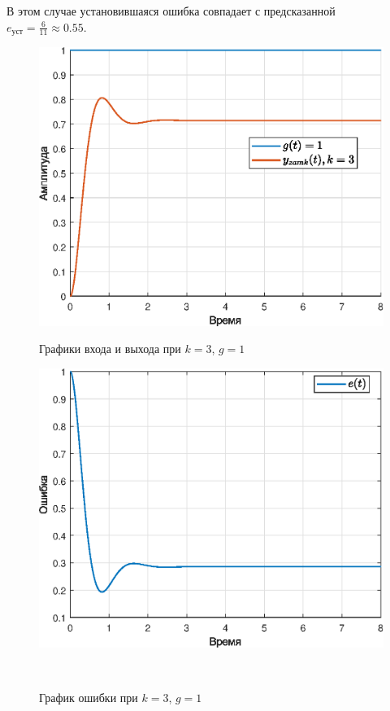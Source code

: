 \documentclass[a4paper]{article}
\begin{document}
В этом случае установившаяся ошибка совпадает с предсказанной $e_{\text{уст}} =\frac{6}{11} \approx 0.55$.

\begin{figure}[H]
    \begin{minipage}{0.5\textwidth}
        \centering \includegraphics[width=\textwidth]{ex3/k3_g_a.eps}
        \caption{Графики входа и выхода при $k=3$, $g=1$}
    \end{minipage}\hfill
    \begin{minipage}{0.5\textwidth}
        \centering \includegraphics[width=\textwidth]{ex3/k3_g_a_error.eps}
        \caption{График ошибки при $k=3$, $g=1$}
    \end{minipage}\\[1em]
\end{figure}\noindent\
\end{document}
